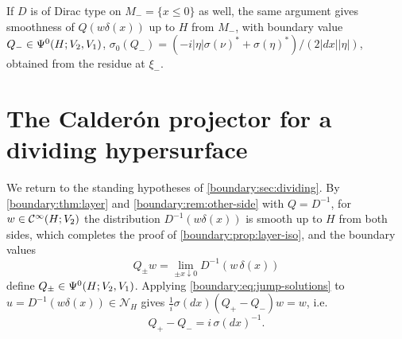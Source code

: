 \begin{remark}\label{boundary:rem:other-side}
If $D$ is of Dirac type on $M_-=\{x\le0\}$ as well, the same argument gives
smoothness of $Q(w\delta(x))$ up to $H$ from $M_-$, with boundary value
$Q_-\in\Psi^{0}(H;V_2,V_1)$, $\sigma_0(Q_-)=(-i|\eta|\sigma(\nu)^*+\sigma(\eta)^*)/
(2|dx||\eta|)$, obtained from the residue at $\xi_-$.
\end{remark}

\section{The Calder\'on projector for a dividing hypersurface}\label{boundary:sec:calderon-dividing}

We return to the standing hypotheses of \cref{boundary:sec:dividing}. By
\cref{boundary:thm:layer} and \cref{boundary:rem:other-side} with $Q=D^{-1}$, for
$w\in\mathcal{C}^\infty(H;V_2)$ the distribution $D^{-1}(w\delta(x))$ is smooth up to $H$ from both
sides, which completes the proof of \cref{boundary:prop:layer-iso}, and the boundary
values
\begin{equation*}
Q_\pm w=\lim_{\pm x\downarrow0}D^{-1}(w\,\delta(x))
\end{equation*}
define $Q_\pm\in\Psi^{0}(H;V_2,V_1)$. Applying \eqref{boundary:eq:jump-solutions} to
$u=D^{-1}(w\delta(x))\in\mathcal{N}_H$ gives $\frac1i\sigma(dx)(Q_+-Q_-)w=w$, i.e.
\begin{equation}\label{boundary:eq:Qjump}
Q_+-Q_-=i\,\sigma(dx)^{-1}.
\end{equation}

